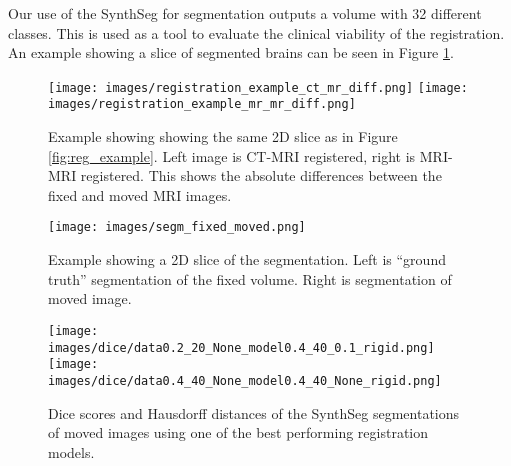 Our use of the SynthSeg for segmentation outputs a volume with 32 different classes. This is used as a tool to evaluate the clinical viability of the registration. An example showing a slice of segmented brains can be seen in Figure \ref{fig:seg_diff}.

\begin{figure}[h!]
  \centering
  \begin{minipage}{0.45\textwidth}
    \centering
    \texttt{[image: images/registration\_example\_ct\_mr\_diff.png]}
    \texttt{[image: images/registration\_example\_mr\_mr\_diff.png]}
    \caption{Example showing showing the same 2D slice as in Figure \ref{fig:reg_example}. Left image is CT-MRI registered, right is MRI-MRI registered. This shows the absolute differences between the fixed and moved MRI images.}\label{fig:reg_diff}
  \end{minipage}\hfill
  \begin{minipage}{0.45\textwidth}
    \centering
    \texttt{[image: images/segm\_fixed\_moved.png]}
    \caption{Example showing a 2D slice of the segmentation. Left is ``ground truth'' segmentation of the fixed volume. Right is segmentation of moved image.}\label{fig:seg_diff}
  \end{minipage}
\end{figure}

\begin{figure}[h!]
    \centering
    \texttt{[image: images/dice/data0.2\_20\_None\_model0.4\_40\_0.1\_rigid.png]}
    \texttt{[image: images/dice/data0.4\_40\_None\_model0.4\_40\_None\_rigid.png]}
    \caption{Dice scores and Hausdorff distances of the SynthSeg segmentations of moved images using one of the best performing registration models.}\label{fig:dice_haus_example}
\end{figure}
